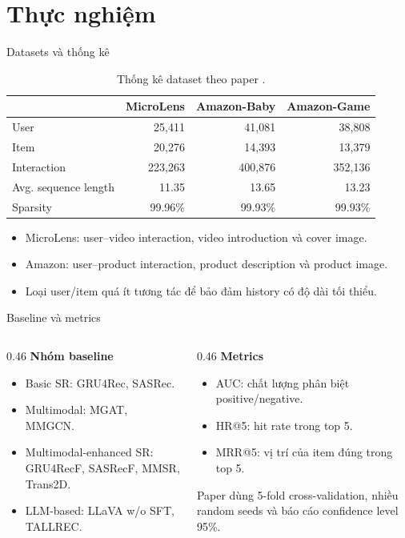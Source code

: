 \section{Thực nghiệm}
\begin{frame}{Datasets và thống kê}
  \begin{table}\centering\scriptsize
    \begin{tabular}{lrrr}\toprule
      & MicroLens & Amazon-Baby & Amazon-Game\\\midrule
      User & 25,411 & 41,081 & 38,808\\
      Item & 20,276 & 14,393 & 13,379\\
      Interaction & 223,263 & 400,876 & 352,136\\
      Avg. sequence length & 11.35 & 13.65 & 13.23\\
      Sparsity & 99.96\% & 99.93\% & 99.93\%\\\bottomrule
    \end{tabular}
    \caption{Thống kê dataset theo paper \cite{ye2025mllmmsr}.}
  \end{table}
  \begin{itemize}\small
    \item MicroLens: user–video interaction, video introduction và cover image.
    \item Amazon: user–product interaction, product description và product image.
    \item Loại user/item quá ít tương tác để bảo đảm history có độ dài tối thiểu.
  \end{itemize}
\end{frame}

\begin{frame}{Baseline và metrics}
  \begin{columns}[T,onlytextwidth]
    \begin{column}{0.46\textwidth}\small
      \textbf{Nhóm baseline}
      \begin{itemize}
        \item Basic SR: GRU4Rec, SASRec.
        \item Multimodal: MGAT, MMGCN.
        \item Multimodal-enhanced SR: GRU4RecF, SASRecF, MMSR, Trans2D.
        \item LLM-based: LLaVA w/o SFT, TALLREC.
      \end{itemize}
    \end{column}
    \begin{column}{0.46\textwidth}\small
      \textbf{Metrics}
      \begin{itemize}
        \item AUC: chất lượng phân biệt positive/negative.
        \item HR@5: hit rate trong top 5.
        \item MRR@5: vị trí của item đúng trong top 5.
      \end{itemize}
      \vspace{0.1cm}Paper dùng 5-fold cross-validation, nhiều random seeds và báo cáo confidence level 95\%.
    \end{column}
  \end{columns}
\end{frame}

